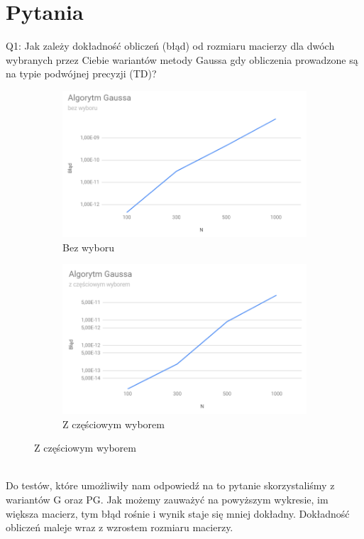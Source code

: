 \documentclass[11pt]{article}
\begin{document}
\section{Pytania}
Q1: Jak zależy dokładność obliczeń (błąd) od rozmiaru macierzy dla dwóch wybranych
przez Ciebie wariantów metody Gaussa gdy obliczenia prowadzone są na typie
podwójnej precyzji (TD)?
\begin{figure}[h!]
  \centering
  \begin{subfigure}[b]{0.45\linewidth}
    \includegraphics[width=\linewidth]{wykres_blad_g_double.png}
    \caption{Bez wyboru}
  \end{subfigure}
  \begin{subfigure}[b]{0.45\linewidth}
    \includegraphics[width=\linewidth]{wykres_blad_pg_double.png}
    \caption{Z częściowym wyborem}
  \end{subfigure}
  \label{fig:wykres}
\end{figure}
\\[1\baselineskip]
Do testów, które umożliwiły nam odpowiedź na to pytanie skorzystaliśmy z wariantów G oraz PG. Jak możemy zauważyć na powyższym wykresie, im większa macierz, tym błąd rośnie i wynik staje się mniej dokładny. Dokładność obliczeń maleje wraz z wzrostem rozmiaru macierzy.
\end{document}

